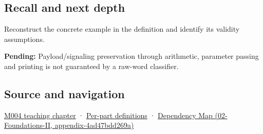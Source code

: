 \subsection{Recall and next depth}\label{appendix-d6607cc4c235-recall-and-next-depth}

Reconstruct the concrete example in the definition and identify its validity assumptions.

\textbf{Pending:} Payload/signaling preservation through arithmetic, parameter passing and printing is not guaranteed by a raw-word classifier.

\subsection{Source and navigation}\label{appendix-d6607cc4c235-source-and-navigation}

\hyperref[01-foundations-i-ch001-a-stretching-ruler-for-real-valued-quantities]{M004 teaching chapter} · \hyperref[appendix-fd090d982a15-m004---parts-61-76]{Per-part definitions} · \href{../02-Foundations-II/main.pdf\#nameddest=appendix-4ad47bdd269a}{Dependency Map (02-Foundations-II, appendix-4ad47bdd269a)}
